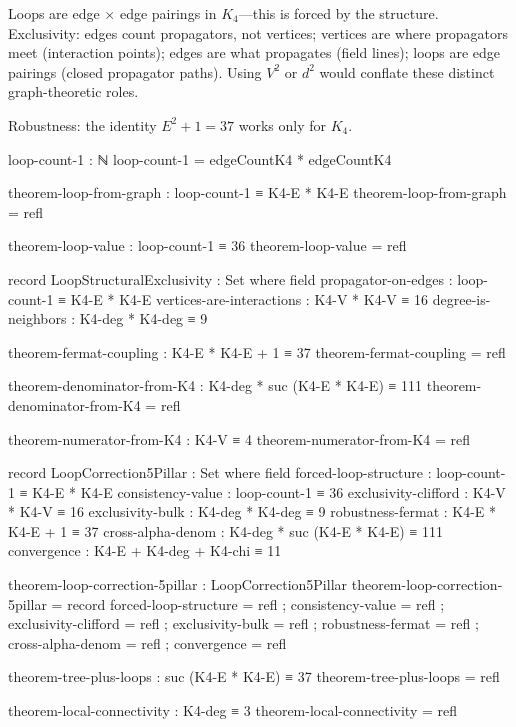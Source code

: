 \documentclass[11pt,a4paper]{book}
\begin{document}
Loops are edge $\times$ edge pairings in $K_4$---this is forced by the structure. Exclusivity: edges count propagators, not vertices; vertices are where propagators meet (interaction points); edges are what propagates (field lines); loops are edge pairings (closed propagator paths). Using $V^2$ or $d^2$ would conflate these distinct graph-theoretic roles.

Robustness: the identity $E^2 + 1 = 37$ works only for $K_4$.

\begin{code}
loop-count-1 : ℕ
loop-count-1 = edgeCountK4 * edgeCountK4

theorem-loop-from-graph : loop-count-1 ≡ K4-E * K4-E
theorem-loop-from-graph = refl

theorem-loop-value : loop-count-1 ≡ 36
theorem-loop-value = refl

record LoopStructuralExclusivity : Set where
  field
    propagator-on-edges : loop-count-1 ≡ K4-E * K4-E
    vertices-are-interactions : K4-V * K4-V ≡ 16
    degree-is-neighbors : K4-deg * K4-deg ≡ 9

theorem-fermat-coupling : K4-E * K4-E + 1 ≡ 37
theorem-fermat-coupling = refl

theorem-denominator-from-K4 : K4-deg * suc (K4-E * K4-E) ≡ 111
theorem-denominator-from-K4 = refl

theorem-numerator-from-K4 : K4-V ≡ 4
theorem-numerator-from-K4 = refl

record LoopCorrection5Pillar : Set where
  field
    forced-loop-structure : loop-count-1 ≡ K4-E * K4-E
    consistency-value : loop-count-1 ≡ 36
    exclusivity-clifford : K4-V * K4-V ≡ 16
    exclusivity-bulk : K4-deg * K4-deg ≡ 9
    robustness-fermat : K4-E * K4-E + 1 ≡ 37
    cross-alpha-denom : K4-deg * suc (K4-E * K4-E) ≡ 111
    convergence : K4-E + K4-deg + K4-chi ≡ 11

theorem-loop-correction-5pillar : LoopCorrection5Pillar
theorem-loop-correction-5pillar = record
  { forced-loop-structure = refl
  ; consistency-value = refl
  ; exclusivity-clifford = refl
  ; exclusivity-bulk = refl
  ; robustness-fermat = refl
  ; cross-alpha-denom = refl
  ; convergence = refl
  }
\end{code}

\begin{code}
theorem-tree-plus-loops : suc (K4-E * K4-E) ≡ 37
theorem-tree-plus-loops = refl
\end{code}

\begin{code}
theorem-local-connectivity : K4-deg ≡ 3
theorem-local-connectivity = refl
\end{code}
\end{document}
